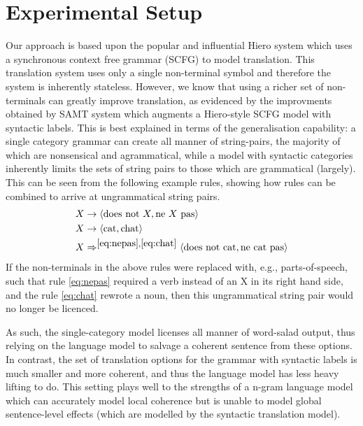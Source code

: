 \chapter{Experimental Setup}
\label{chapter:setup}

Our approach is based upon the popular and influential Hiero system \citep{chiang:2007} which uses a synchronous context free grammar (SCFG) to model translation. 
This translation system uses only a single non-terminal symbol and therefore the system is inherently stateless. 
However, we know that using a richer set of non-terminals can greatly improve translation, as evidenced by the improvments obtained by SAMT system \citep{samt} which augments a Hiero-style SCFG model with syntactic labels.
This is best explained in terms of the generalisation capability: a single category grammar can create all manner of string-pairs, the majority of which are nonsensical and agrammatical, while a model with syntactic categories inherently limits the sets of string pairs to those which are grammatical (largely).
This can be seen from the following example rules, showing how rules can be combined to arrive at ungrammatical string pairs.
\begin{align}
X &\rightarrow \langle \mbox{does not}~X, \mbox{ne}~X~\mbox{pas} \rangle \label{eq:nepas}\\
X &\rightarrow \langle \mbox{cat}, \mbox{chat} \rangle \label{eq:chat} \\
X &\Rightarrow^{\ref{eq:nepas},\ref{eq:chat}} \langle \mbox{does not cat}, \mbox{ne cat pas} \rangle
\nonumber
\end{align}
If the non-terminals in the above rules were replaced with, e.g., parts-of-speech, such that rule \ref{eq:nepas} required a verb instead of an X in its right hand side, and the rule \ref{eq:chat} rewrote a noun, then this ungrammatical string pair would no longer be licenced.

As such, the single-category model licenses all manner of word-salad output, thus relying on the language model to salvage a coherent sentence from these options.
In contrast, the set of translation options for the grammar with syntactic labels is much smaller and more coherent, and thus the language model has less heavy lifting to do.
This setting plays well to the strengths of a n-gram language model which can accurately model local coherence but is unable to model global sentence-level effects (which are modelled by the syntactic translation model). 

